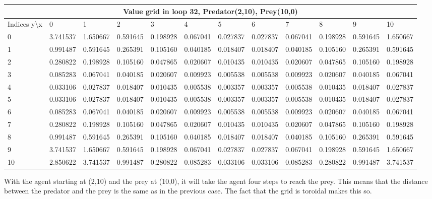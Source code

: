 \documentclass{article}
\begin{document}
\begin{center}
\scalebox{0.7}
	{
	\begin{tabular}{ |l | l | l | l | l | l | l | l | l | l | l | l|}
	\hline
	\multicolumn{12}{|c|}{Value grid in loop 32, Predator(2,10), Prey(10,0)}\\
	\hline
	Indices y\textbackslash x &0 & 1 & 2 & 3 & 4 & 5 & 6 & 7 & 8 & 9 & 10 \\ 

\hline
0 & 3.741537 & 1.650667 & 0.591645 & 0.198928 & 0.067041 & 0.027837 & 0.027837 & 0.067041 & 0.198928 & 0.591645 & 1.650667 \\
1 & 0.991487 & 0.591645 & 0.265391 & 0.105160 & 0.040185 & 0.018407 & 0.018407 & 0.040185 & 0.105160 & 0.265391 & 0.591645 \\
2 & 0.280822 & 0.198928 & 0.105160 & 0.047865 & 0.020607 & 0.010435 & 0.010435 & 0.020607 & 0.047865 & 0.105160 & \cellcolor{green!40}0.198928 \\
3 & 0.085283 & 0.067041 & 0.040185 & 0.020607 & 0.009923 & 0.005538 & 0.005538 & 0.009923 & 0.020607 & 0.040185 & 0.067041 \\
4 & 0.033106 & 0.027837 & 0.018407 & 0.010435 & 0.005538 & 0.003357 & 0.003357 & 0.005538 & 0.010435 & 0.018407 & 0.027837 \\
5 & 0.033106 & 0.027837 & 0.018407 & 0.010435 & 0.005538 & 0.003357 & 0.003357 & 0.005538 & 0.010435 & 0.018407 & 0.027837 \\
6 & 0.085283 & 0.067041 & 0.040185 & 0.020607 & 0.009923 & 0.005538 & 0.005538 & 0.009923 & 0.020607 & 0.040185 & 0.067041 \\
7 & 0.280822 & 0.198928 & 0.105160 & 0.047865 & 0.020607 & 0.010435 & 0.010435 & 0.020607 & 0.047865 & 0.105160 & 0.198928 \\
8 & 0.991487 & 0.591645 & 0.265391 & 0.105160 & 0.040185 & 0.018407 & 0.018407 & 0.040185 & 0.105160 & 0.265391 & 0.591645 \\
9 & 3.741537 & 1.650667 & 0.591645 & 0.198928 & 0.067041 & 0.027837 & 0.027837 & 0.067041 & 0.198928 & 0.591645 & 1.650667 \\
10 & \cellcolor{red!40}2.850622 & 3.741537 & 0.991487 & 0.280822 & 0.085283 & 0.033106 & 0.033106 & 0.085283 & 0.280822 & 0.991487 & 3.741537 \\

\hline
	\end{tabular}
	}
\end{center}

With the agent starting at (2,10) and the prey at (10,0), it will take the agent four steps to reach the prey. This means that the distance between the predator and the prey is the same as in the previous case. The fact that the grid is toroidal makes this so.
\end{document}
